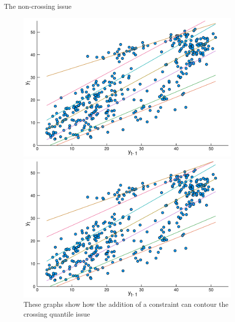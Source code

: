 \begin{frame}{The non-crossing issue}

\begin{figure}
  \centering
  \begin{minipage}[t]{\linewidth}
    \centering
    \begin{minipage}[t]{0.45\linewidth}
      \centering     \includegraphics[width=\textwidth]{Imagens/icaraizinho-quantile-linear-scatter-crossing}
    \end{minipage}
    \begin{minipage}[t]{0.45\linewidth}
      \centering     \includegraphics[width=\textwidth]{Imagens/icaraizinho-quantile-linear-scatter}
    \end{minipage}
  \end{minipage}
  \caption{These graphs show how the addition of a constraint can contour the crossing quantile issue}
  \label{fig:quantiles-vs-xt}
\end{figure}

\end{frame}

